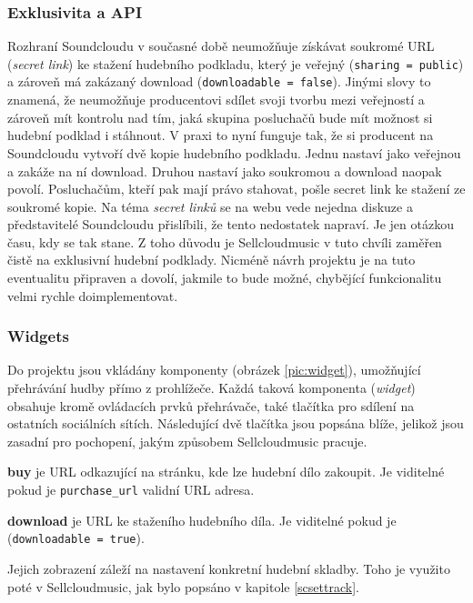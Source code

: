 \documentclass[12pt]{article}
\begin{document}
\subsubsection{Exklusivita a API} \label{exclusivity}

Rozhraní Soundcloudu v současné době neumožňuje získávat soukromé URL (\emph{secret link}) ke stažení hudebního podkladu, který je veřejný (\texttt{sharing = public}) a zároveň má zakázaný download (\texttt{downloadable = false}). Jinými slovy to znamená, že neumožňuje producentovi sdílet svoji tvorbu mezi veřejností a zároveň mít kontrolu nad tím, jaká skupina posluchačů bude mít možnost si hudební podklad i stáhnout. V praxi to nyní funguje tak, že si producent na Soundcloudu vytvoří dvě kopie hudebního podkladu. Jednu nastaví jako veřejnou a zakáže na ní download. Druhou nastaví jako soukromou a download naopak povolí. Posluchačům, kteří pak mají právo stahovat, pošle secret link ke stažení ze soukromé kopie.
Na téma \emph{secret linků} se na webu vede nejedna diskuze a představitelé Soundcloudu přislíbili, že tento nedostatek napraví. Je jen otázkou času, kdy se tak stane.
Z toho důvodu je Sellcloudmusic v tuto chvíli zaměřen čistě na exklusivní hudební podklady. Nicméně návrh projektu je na tuto eventualitu připraven a dovolí, jakmile to bude možné, chybějící funkcionalitu velmi rychle doimplementovat.

\subsubsection{Widgets} \label{widget}
Do projektu jsou vkládány komponenty (obrázek \ref{pic:widget}), umožňující přehrávání hudby přímo z prohlížeče. Každá taková komponenta (\emph{widget}) obsahuje kromě ovládacích prvků přehrávače, také tlačítka pro sdílení na ostatních sociálních sítích. Následující dvě tlačítka jsou popsána blíže, jelikož jsou zasadní pro pochopení, jakým způsobem Sellcloudmusic pracuje.

\begin{description}
\item{\textbf{buy}} je URL odkazující na stránku, kde lze hudební dílo zakoupit. Je viditelné pokud je \texttt{purchase\_url} validní URL adresa.
\item{\textbf{download}} je URL ke staženího hudebního díla. Je viditelné pokud je (\texttt{downloadable = true}).
\end{description}

Jejich zobrazení záleží na nastavení konkretní hudební skladby. Toho je využito poté v Sellcloudmusic, jak bylo popsáno v kapitole \ref{scsettrack}.
\end{document}
